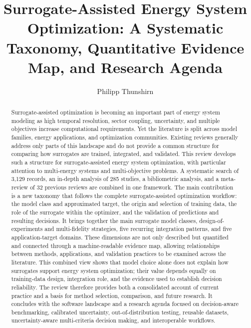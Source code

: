 \documentclass[final,5p,times,twocolumn]{elsarticle}
\begin{document}
\begin{frontmatter}

\title{Surrogate-Assisted Energy System Optimization: A Systematic
Taxonomy, Quantitative Evidence Map, and Research Agenda}

\author[label1]{Philipp Thunshirn}

\begin{abstract}
Surrogate-assisted optimization is becoming an important part of energy system modeling as high temporal resolution, sector coupling, uncertainty, and multiple objectives increase computational requirements. Yet the literature is split across model families, energy applications, and optimization communities. Existing reviews generally address only parts of this landscape and do not provide a common structure for comparing how surrogates are trained, integrated, and validated. This review develops such a structure for surrogate-assisted energy system optimization, with particular attention to multi-energy systems and multi-objective problems. A systematic search of 3,129 records, an in-depth analysis of 285 studies, a bibliometric analysis, and a meta-review of 32 previous reviews are combined in one framework. The main contribution is a new taxonomy that follows the complete surrogate-assisted optimization workflow: the model class and approximated target, the origin and selection of training data, the role of the surrogate within the optimizer, and the validation of predictions and resulting decisions. It brings together the main surrogate model classes, design-of-experiments and multi-fidelity strategies, five recurring integration patterns, and five application-target domains. These dimensions are not only described but quantified and connected through a machine-readable evidence map, allowing relationships between methods, applications, and validation practices to be examined across the literature. This combined view shows that model choice alone does not explain how surrogates support energy system optimization; their value depends equally on training-data design, integration role, and the evidence used to establish decision reliability. The review therefore provides both a consolidated account of current practice and a basis for method selection, comparison, and future research. It concludes with the software landscape and a research agenda focused on decision-aware benchmarking, calibrated uncertainty, out-of-distribution testing, reusable datasets, uncertainty-aware multi-criteria decision making, and interoperable workflows.
\end{abstract}


\end{frontmatter}
\end{document}
